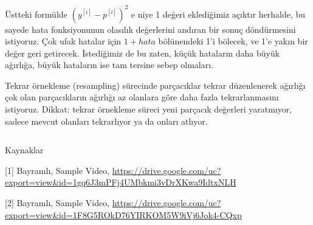 \documentclass[12pt,fleqn]{article}\usepackage{../../common}
\begin{document}
Üstteki formülde $(y^{[i]} - p^{[i]})^2$ e niye 1 değeri eklediğimiz açıktır
herhalde, bu sayede hata fonksiyonunun olasılık değerlerini andıran bir sonuç
döndürmesini istiyoruz. Çok ufak hatalar için $1 + hata$ bölünendeki 1'i
bölecek, ve 1'e yakın bir değer geri getirecek. İstediğimiz de bu zaten, küçük
hataların daha büyük ağırlığa, büyük hataların ise tam tersine sebep olmaları.

Tekrar örnekleme (resampling) sürecinde parçacıklar tekrar düzenlenerek ağırlığı
çok olan parçacıkların ağırlığı az olanlara göre daha fazla tekrarlanmasını
istiyoruz. Dikkat: tekrar örnekleme süreci yeni parçacık değerleri yaratmıyor,
sadece mevcut olanları tekrarlıyor ya da onları atlıyor.

\inputminted[fontsize=\footnotesize]{python}{track-chess-pf.py}

Kaynaklar

[1] Bayramlı, Sample Video, \url{https://drive.google.com/uc?export=view&id=1gq6J3mPFj4UMbkmi3vDrXKwa9IdtxNLH}

[2] Bayramlı, Sample Video, \url{https://drive.google.com/uc?export=view&id=1F8G5ROkD76YIRKOM5W9iVj6Jok4-CQxp}
\end{document}
